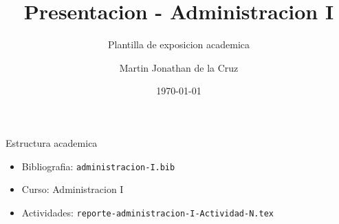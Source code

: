 \documentclass[spanish,aspectratio=169]{beamer}
\title{Presentacion - Administracion I}
\subtitle{Plantilla de exposicion academica}
\author{Martin Jonathan de la Cruz}
\institute{Universidad Ciudadana de Nuevo Leon}
\date{\today}
\begin{document}
\begin{frame}
  \titlepage
\end{frame}

\begin{frame}{Estructura academica}
  \begin{itemize}
    \item Bibliografia: \texttt{administracion-I.bib}
    \item Curso: Administracion I
    \item Actividades: \texttt{reporte-administracion-I-Actividad-N.tex}
  \end{itemize}
\end{frame}
\end{document}
